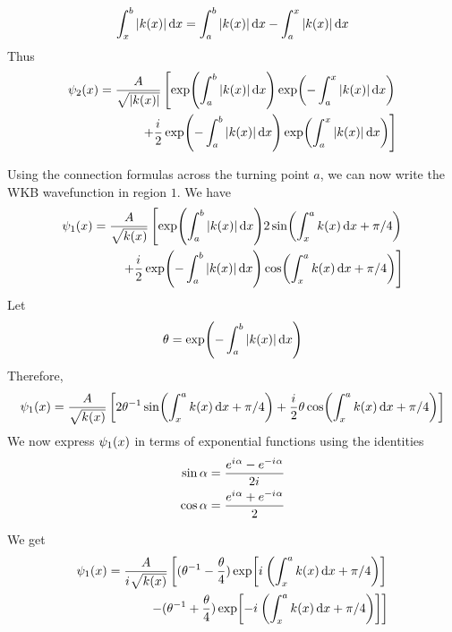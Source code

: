 \begin{equation}
\label{chapter22.eqn4-transmission}
\int_{x}^{b} \abs{k(x)} \dd{x} = \int_{a}^{b} \abs{k(x)} \dd{x} - \int_{a}^{x} \abs{k(x)} \dd{x}
\end{equation}
Thus
\begin{equation}
\label{chapter22.eqn5-transmission}
\begin{split}
\psi_2(x) = \frac{A}{\sqrt{\abs{k(x)}}} \left[
\exp(\int_{a}^{b} \abs{k(x)} \dd{x})\exp(-\int_{a}^{x} \abs{k(x)} \dd{x})
 \right.
 \\
 \left.
 +
  \frac{{i\mkern1mu}}{2} \exp(-\int_{a}^{b} \abs{k(x)} \dd{x})\exp(\int_{a}^{x} \abs{k(x)} \dd{x})
\right]
\end{split}
\end{equation}

Using the connection formulas across the turning point $a$, we can now write the WKB wavefunction in region $1$. We have 
\begin{align}
\label{chapter22.eqn6-transmission}
\begin{split}
\psi_1\qty(x) =
\frac{A}{\sqrt{k(x)}} 
\left[
\exp(\int_{a}^{b} \abs{k(x)} \dd{x}) 2 \sin(\int_{x}^{a} k(x) \dd{x} + \pi/4) \right.\\
\left.
+ 
\frac{{i\mkern1mu}}{2} \exp(-\int_{a}^{b} \abs{k(x)}\dd{x}) \cos(\int_{x}^{a}k(x) \dd{x} + \pi/4)
\right]
\end{split}
\end{align}
Let
\begin{equation}
\label{chapter22.eqn7-transmission}
\theta = \exp(-\int_{a}^{b} \abs{k(x)} \dd{x})
\end{equation}
Therefore,
\begin{align}
\label{chapter22.eqn8-transmission}
\psi_1\qty(x) =
\frac{A}{\sqrt{k(x)}} 
\left[
2\theta^{-1} \sin(\int_{x}^{a} k(x) \dd{x} + \pi/4) 
+ 
\frac{{i\mkern1mu}}{2} \theta \cos(\int_{x}^{a}k(x) \dd{x} + \pi/4)
\right]
\end{align}
We now express $\psi_1\qty(x)$ in terms of exponential functions using the identities
\begin{align*}
	\sin\alpha &= \frac{e^{{i\mkern1mu} \alpha} - e^{-{i\mkern1mu} \alpha}}{2{i\mkern1mu}}\\
	\cos\alpha &= \frac{e^{{i\mkern1mu} \alpha} + e^{-{i\mkern1mu} \alpha}}{2}
\end{align*}


We get
\begin{align}
\label{chapter22.eqn9-transmission}
\begin{split}
\psi_1\qty(x) = \frac{A}{{i\mkern1mu} \sqrt{k(x)}} \left[
(\theta^{-1} - \frac{\theta}{4}) \exp[{i\mkern1mu} \left(\int_{x}^{a} k(x) \dd{x} + \pi/4\right)]
\right. 
\\
\left.
- (\theta^{-1} + \frac{\theta}{4}) \exp[-{i\mkern1mu} \left(\int_{x}^{a} k(x) \dd{x} + \pi/4\right)]
\right]
\end{split}
\end{align}


